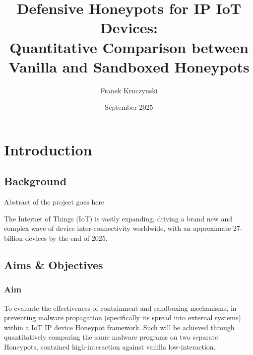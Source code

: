 \documentclass[a4paper,12pt,oneside]{book}			%
\title{\huge\bfseries Defensive Honeypots for IP IoT Devices:\\Quantitative  Comparison between Vanilla and Sandboxed Honeypots}
\author{\LARGE Franek Kruczynski}
\date{September 2025}
\begin{document}
\frontmatter			%
\maketitle				%
\setcounter{page}{1}		%
\pagestyle{fancy}

\tableofcontents 			%

\mainmatter 			%
\clearpage			




\chapter{Introduction}\label{ch:intro}		%
\section{Background}\label{sec:background}	%

Abstract of the project goes here

The Internet of Things (IoT) is vastly expanding, driving a brand new and complex wave of device inter-connectivity worldwide, with an approximate 27-billion devices by the end of 2025\textit{\citep{autobits2025iot}}.

\section{Aims \&{} Objectives}\label{sec:aimAndObjectives}

\subsection{Aim}\label{sec:aim}

To evaluate the effectiveness of containment and sandboxing mechanisms, in preventing malware propagation (specifically its spread into external systems) within a IoT IP device Honeypot framework. Such will be achieved through quantitatively comparing the same malware programs on two separate Honeypots, contained high-interaction against vanilla low-interaction. 
\end{document}
